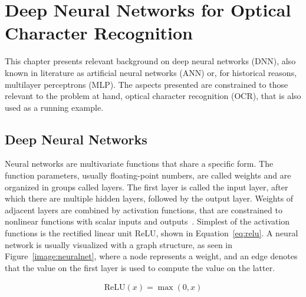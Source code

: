 \documentclass{article}
\begin{document}

\section{Deep Neural Networks for Optical Character Recognition}


This chapter presents relevant background on deep neural networks (DNN), also known 
in literature as artificial neural networks (ANN) or, for historical reasons, multilayer perceptrons (MLP).
The aspects presented are constrained to those relevant to the problem at hand, optical character recognition (OCR),
that is also used as a running example.

\subsection{Deep Neural Networks}


Neural networks are multivariate functions that share a specific form.
The function parameters, usually floating-point numbers, are called weights and are organized in groups called layers.
The first layer is called the input layer, after which there are multiple hidden layers, followed by the output layer.
Weights of adjacent layers are combined by activation functions, that are constrained to nonlinear functions with 
scalar inputs and outputs~\cite{princebook}. Simplest of the activation functions is the rectified
linear unit ReLU, shown in Equation~\ref{eq:relu}. A neural network is usually visualized with a graph structure, as seen in Figure~\ref{image:neuralnet}, where a node represents a 
weight, and an edge denotes that the value on the first layer is used to compute the value on the latter.

\begin{align}
    \text{ReLU}(x) = \max(0, x)
    \label{eq:relu}
\end{align}
\end{document}
